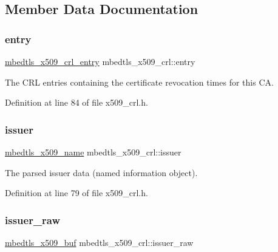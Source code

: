 \subsection{Member Data Documentation}
\mbox{\label{structmbedtls__x509__crl_a880036b1b4a2b449542f8f1fa389694f}} 
\subsubsection{\texorpdfstring{entry}{entry}}
{\footnotesize\ttfamily \mbox{\hyperlink{structmbedtls__x509__crl__entry}{mbedtls\+\_\+x509\+\_\+crl\+\_\+entry}} mbedtls\+\_\+x509\+\_\+crl\+::entry}

The C\+RL entries containing the certificate revocation times for this CA. 

Definition at line 84 of file x509\+\_\+crl.\+h.

\mbox{\label{structmbedtls__x509__crl_aae988566d13fadf805d8ad31d13b44d8}} 
\subsubsection{\texorpdfstring{issuer}{issuer}}
{\footnotesize\ttfamily \mbox{\hyperlink{group__x509__module_ga2272228c7776102328df31623af3168c}{mbedtls\+\_\+x509\+\_\+name}} mbedtls\+\_\+x509\+\_\+crl\+::issuer}

The parsed issuer data (named information object). 

Definition at line 79 of file x509\+\_\+crl.\+h.

\mbox{\label{structmbedtls__x509__crl_a009d0e1b844df85a2389ec10b770a6f6}} 
\subsubsection{\texorpdfstring{issuer\+\_\+raw}{issuer\_raw}}
{\footnotesize\ttfamily \mbox{\hyperlink{group__x509__module_ga4d02c9e8e4e2934555e0d132cd2976dc}{mbedtls\+\_\+x509\+\_\+buf}} mbedtls\+\_\+x509\+\_\+crl\+::issuer\+\_\+raw}

